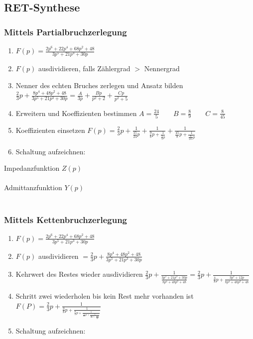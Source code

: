\subsection{RET-Synthese}
\begin{multicols}{2}
\subsubsection{Mittels Partialbruchzerlegung}
	\begin{enumerate}
	  \item $F(p)=\frac{2p^6+22p^4+68p^2+48}{3p^5+21p^3+30p}$
	  \item $F(p)$ ausdividieren, falls Zählergrad $>$ Nennergrad
	  \item Nenner des echten Bruches zerlegen und Ansatz bilden
	  $\frac{2}{3}p+\frac{8p^4+48p^2+48}{3p^5+21p^3+30p}=\frac{A}{3p}+\frac{Bp}{p^2+2}+\frac{Cp}{p^2+5}$
		\item Erweitern und Koeffizienten bestimmen $A=\frac{24}{5} \qquad
		B=\frac{8}{9} \qquad C=\frac{8}{45}$
		\item Koeffizienten einsetzen
		$F(p)=\frac{2}{3}p+\frac{1}{\frac{15}{24}p}+\frac{1}{\frac{9}{8}p+\frac{1}{\frac{4}{9}p}}+\frac{1}{\frac{45}{8}p+\frac{1}{\frac{8}{255}p}}$
		\item Schaltung aufzeichnen:	  
	\end{enumerate}
	Impedanzfunktion $Z(p)$\\
	\\
	Admittanzfunktion $Y(p)$\\
	\\
\subsubsection{Mittels Kettenbruchzerlegung}
\begin{enumerate}
	\item $F(p)=\frac{2p^6+22p^4+68p^2+48}{3p^5+21p^3+30p}$
	\item $F(p)$ ausdividieren $=\frac{2}{3}p+\frac{8p^4+48p^2+48}{3p^5+21p^3+30p}$
	\item Kehrwert des Restes wieder ausdividieren
	$\frac{2}{3}p+\frac{1}{\frac{3p^5+21p^3+30p}{8p^4+48p^2+48}}=\frac{2}{3}p+\frac{1}{\frac{3}{8}p+\frac{3p^3+12p}{8p^4+48p^2+48}}$
	\item Schritt zwei wiederholen bis kein Rest mehr vorhanden ist
	$F(P)=\frac{2}{3}p+\frac{1}{\frac{3}{8}p+\frac{1}{\frac{8}{3}p+\frac{1}{\frac{3}{16}p+\frac{1}{\frac{16}{3}p+\frac{1}{\frac{1}{16}p}}}}}$
	\item Schaltung aufzeichnen:
\end{enumerate}
\end{multicols}



